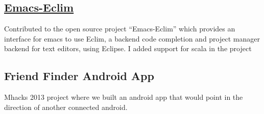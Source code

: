 \documentclass[5pt]{resume}
\begin{document}
\subsection{\textbf{\href{''https://github.com/senny/emacs-eclim''}{Emacs-Eclim}}}
{\color{default} Contributed to the open source project “Emacs-Eclim”
  which provides an interface for emacs to use Eclim, a backend code completion
  and project manager backend for text editors, using Eclipse. I added support for scala in the project }
\subsection{\textbf{Friend Finder Android App}} 
{\color{default} Mhacks 2013 project where we built an android app that
  would point in the direction of another connected android.}
\\
\end{document}
